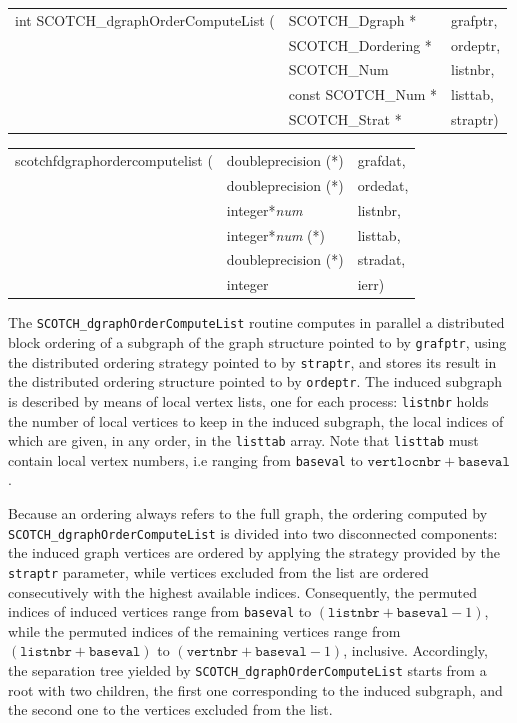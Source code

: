 \begin{itemize}
\progsyn

{\tt\begin{tabular}{l@{}ll}
int SCOTCH\_dgraphOrderComputeList ( & SCOTCH\_Dgraph *    & grafptr, \\
                                     & SCOTCH\_Dordering * & ordeptr, \\
                                     & SCOTCH\_Num         & listnbr, \\
                                     & const SCOTCH\_Num * & listtab, \\
                                     & SCOTCH\_Strat *     & straptr)
\end{tabular}}

{\tt\begin{tabular}{l@{}ll}
scotchfdgraphordercomputelist ( & doubleprecision (*)   & grafdat, \\
                                & doubleprecision (*)   & ordedat, \\
                                & integer*{\it num}     & listnbr, \\
                                & integer*{\it num} (*) & listtab, \\
                                & doubleprecision (*)   & stradat, \\
                                & integer               & ierr)
\end{tabular}}

\progdes

The \texttt{SCOTCH\_dgraphOrderComputeList} routine computes in parallel
a distributed block ordering of a subgraph of the graph structure
pointed to by \texttt{grafptr}, using the distributed ordering strategy
pointed to by \texttt{straptr}, and stores its result in the distributed
ordering structure pointed to by \texttt{ordeptr}. The induced subgraph
is described by means of local vertex lists, one for each process:
\texttt{listnbr} holds the number of local vertices to keep in the
induced subgraph, the local indices of which are given, in any order, in
the \texttt{listtab} array. Note that \texttt{listtab} must contain local
vertex numbers, i.e ranging from \texttt{baseval} to $\mathtt{vertlocnbr}
+ \mathtt{baseval}$.

Because an ordering always refers to the full graph, the ordering
computed by \texttt{SCOTCH\_\lbt dgraph\lbt Order\lbt Compute\lbt List}
is divided into two disconnected components: the induced graph
vertices are ordered by applying the strategy provided by the
\texttt{straptr} parameter, while vertices excluded from the list are
ordered consecutively with the highest available indices. Consequently,
the permuted indices of induced vertices range from \texttt{baseval}
to $(\mathtt{listnbr} + \mathtt{baseval} - 1)$, while the permuted
indices of the remaining vertices range from $(\mathtt{listnbr} +
\mathtt{baseval})$ to $(\mathtt{vertnbr} + \mathtt{baseval} - 1)$,
inclusive. Accordingly, the separation tree yielded by
\texttt{SCOTCH\_\lbt dgraph\lbt Order\lbt Compute\lbt List} starts
from a root with two children, the first one corresponding to the
induced subgraph, and the second one to the vertices excluded from the
list.


\end{itemize}
